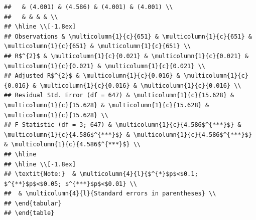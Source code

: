 \documentclass[
  12pt,
  landscape]{article}
\begin{document}
\begin{verbatim}
##   & (4.001) & (4.586) & (4.001) & (4.001) \\ 
##   & & & & \\ 
## \hline \\[-1.8ex] 
## Observations & \multicolumn{1}{c}{651} & \multicolumn{1}{c}{651} & \multicolumn{1}{c}{651} & \multicolumn{1}{c}{651} \\ 
## R$^{2}$ & \multicolumn{1}{c}{0.021} & \multicolumn{1}{c}{0.021} & \multicolumn{1}{c}{0.021} & \multicolumn{1}{c}{0.021} \\ 
## Adjusted R$^{2}$ & \multicolumn{1}{c}{0.016} & \multicolumn{1}{c}{0.016} & \multicolumn{1}{c}{0.016} & \multicolumn{1}{c}{0.016} \\ 
## Residual Std. Error (df = 647) & \multicolumn{1}{c}{15.628} & \multicolumn{1}{c}{15.628} & \multicolumn{1}{c}{15.628} & \multicolumn{1}{c}{15.628} \\ 
## F Statistic (df = 3; 647) & \multicolumn{1}{c}{4.586$^{***}$} & \multicolumn{1}{c}{4.586$^{***}$} & \multicolumn{1}{c}{4.586$^{***}$} & \multicolumn{1}{c}{4.586$^{***}$} \\ 
## \hline 
## \hline \\[-1.8ex] 
## \textit{Note:}  & \multicolumn{4}{l}{$^{*}$p$<$0.1; $^{**}$p$<$0.05; $^{***}$p$<$0.01} \\ 
##  & \multicolumn{4}{l}{Standard errors in parentheses} \\ 
## \end{tabular} 
## \end{table}
\end{verbatim}
\end{document}
